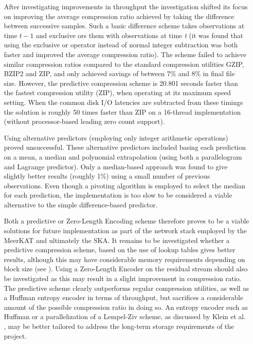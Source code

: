 After investigating improvements in throughput the investigation shifted its focus on improving the average compression ratio achieved by taking the difference between successive samples. Such a basic difference
scheme takes observations at time $t-1$ and exclusive ors them with observations at time \textit{t} (it was found that using the exclusive or operator instead of normal integer subtraction was both faster and improved the average
compression ratio). The scheme failed to achieve similar compression ratios compared to the standard compression utilities GZIP, BZIP2 and ZIP, and only achieved savings of between 7\% and 8\% in final file size.
However, the predictive compression scheme is 20.801 seconds faster than the fastest compression utility (ZIP), when operating at its maximum speed setting. When the common disk I/O latencies are subtracted from these 
timings the solution is roughly 50 times faster than ZIP on a 16-thread implementation (without processor-based leading zero count support).

Using alternative predictors (employing only integer arithmetic operations) proved unsuccessful. These alternative predictors included basing each prediction on a mean, a median and polynomial extrapolation (using both a 
parallelogram and Lagrange predictor). Only a median-based approach was found to give slightly better results (roughly 1\%) using a small number of previous observations. Even though a pivoting algorithm is employed to 
select the median for each prediction, the implementation is too slow to be considered a viable alternative to the simple difference-based predictor.

Both a predictive or Zero-Length Encoding scheme therefore proves to be a viable solutions for future implementation as part of the network stack employed by the MeerKAT and ultimately the SKA. It remains to be investigated whether a predictive 
compression scheme, based on the use of lookup tables gives better results, although this may have considerable memory requirements depending on block size (see \cite{1607248,4589203,4976448}). Using a Zero-Length Encoder on the residual
stream should also be investigated as this may result in a slight improvement in compression ratio. The predictive scheme clearly outperforms regular compression utilities, as well as a Huffman entropy encoder in terms of throughput, 
but sacrifices a considerable amount of the possible compression ratio in doing so. An entropy encoder such as Huffman or a parallelization of a Lempel-Ziv scheme, as discussed by Klein et al. \cite{klein2005parallel}, may be better tailored 
to address the long-term storage requirements of the project.


\glsaddall
\printglossary
